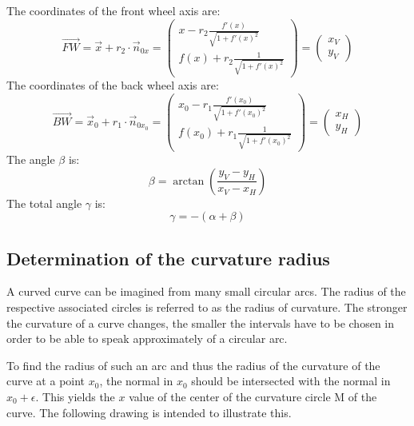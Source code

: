 \documentclass[11pt,english,BCOR=10mm,DIV=12,bibliography=totoc,parskip=false,headings=small,
    headinclude=false,footinclude=false,oneside]{pst-doc}
\begin{document}
The coordinates of the front wheel axis are:
\begin{equation*}
\overrightarrow{FW}=\vec{x}+r_2\cdot \vec{n}_{0x}
=\begin{pmatrix}
x-r_2\frac{f'(x)}{\sqrt{1+f'(x)^2}}\\
f(x)+r_2\frac{1}{\sqrt{1+f'(x)^2}}
\end{pmatrix}
=\begin{pmatrix}
x_V\\y_V
\end{pmatrix}
\end{equation*}
The coordinates of the back wheel axis are:
\begin{equation*}
\overrightarrow{BW}=\vec{x}_0+r_1\cdot \vec{n}_{0x_0}
=\begin{pmatrix}
x_0-r_1\frac{f'(x_0)}{\sqrt{1+f'(x_0)^2}}\\
f(x_0)+r_1\frac{1}{\sqrt{1+f'(x_0)^2}}
\end{pmatrix}
=\begin{pmatrix}
x_H\\y_H
\end{pmatrix}
\end{equation*}
The angle $\beta$ is:
\begin{equation*}
\beta=\arctan\left(\frac{y_V-y_H}{x_V-x_H}\right)
\end{equation*}
The total angle $\gamma$ is:
\begin{equation*}
  \gamma=-(\alpha+\beta)
\end{equation*}






\subsection{Determination of the curvature radius}

A curved curve can be imagined from many small circular arcs. The radius of the respective associated circles is referred to as the radius of curvature. The stronger the curvature of a curve changes, the smaller the intervals have to be chosen in
order to be able to speak approximately of a circular arc.

To find the radius of such an arc and thus the radius of the curvature of the curve at a point $x_{0}$, the normal in $ x_{0} $ should be intersected with the normal in $x_{0}+\epsilon$. This yields the $x$ value of the center of the curvature circle
M of the curve. The following drawing is intended to illustrate this.
\end{document}
